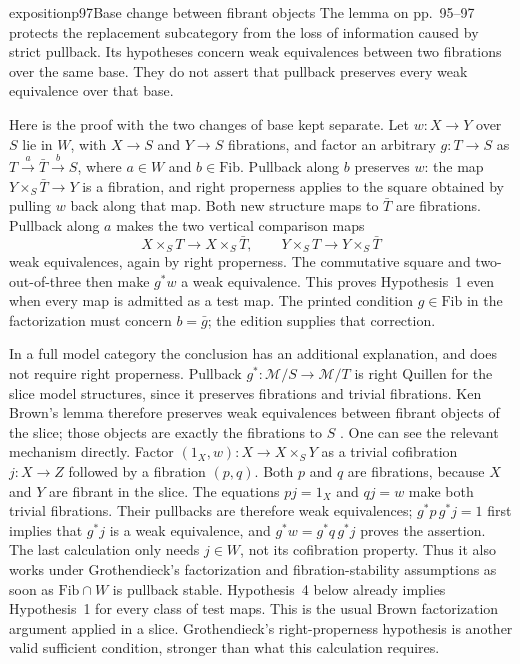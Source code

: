 \begin{dcomment}{exposition}{p97}{Base change between fibrant objects}
The lemma on pp.~95--97 protects the replacement subcategory from the loss of information caused by strict pullback. Its hypotheses concern weak equivalences between two fibrations over the same base. They do not assert that pullback preserves every weak equivalence over that base.

Here is the proof with the two changes of base kept separate. Let $w:X\to Y$ over $S$ lie in $W$, with $X\to S$ and $Y\to S$ fibrations, and factor an arbitrary $g:T\to S$ as $T\xrightarrow{a}\bar T\xrightarrow{b}S$, where $a\in W$ and $b\in\mathrm{Fib}$. Pullback along $b$ preserves $w$: the map $Y\times_S\bar T\to Y$ is a fibration, and right properness applies to the square obtained by pulling $w$ back along that map. Both new structure maps to $\bar T$ are fibrations. Pullback along $a$ makes the two vertical comparison maps
\[
X\times_ST\longrightarrow X\times_S\bar T,
\qquad
Y\times_ST\longrightarrow Y\times_S\bar T
\]
weak equivalences, again by right properness. The commutative square and two-out-of-three then make $g^*w$ a weak equivalence. This proves Hypothesis~1 even when every map is admitted as a test map. The printed condition $g\in\mathrm{Fib}$ in the factorization must concern $b=\bar g$; the edition supplies that correction.

In a full model category the conclusion has an additional explanation, and does not require right properness. Pullback $g^*:\mathcal M/S\to\mathcal M/T$ is right Quillen for the slice model structures, since it preserves fibrations and trivial fibrations. Ken Brown's lemma therefore preserves weak equivalences between fibrant objects of the slice; those objects are exactly the fibrations to $S$ \citep[Lemma~11.3.14 and its dual]{Riehl2014}. One can see the relevant mechanism directly. Factor $(1_X,w):X\to X\times_SY$ as a trivial cofibration $j:X\to Z$ followed by a fibration $(p,q)$. Both $p$ and $q$ are fibrations, because $X$ and $Y$ are fibrant in the slice. The equations $pj=1_X$ and $qj=w$ make both trivial fibrations. Their pullbacks are therefore weak equivalences; $g^*p\,g^*j=1$ first implies that $g^*j$ is a weak equivalence, and $g^*w=g^*q\,g^*j$ proves the assertion. The last calculation only needs $j\in W$, not its cofibration property. Thus it also works under Grothendieck's factorization and fibration-stability assumptions as soon as $\mathrm{Fib}\cap W$ is pullback stable. Hypothesis~4 below already implies Hypothesis~1 for every class of test maps. This is the usual Brown factorization argument applied in a slice. Grothendieck's right-properness hypothesis is another valid sufficient condition, stronger than what this calculation requires.


\end{dcomment}
